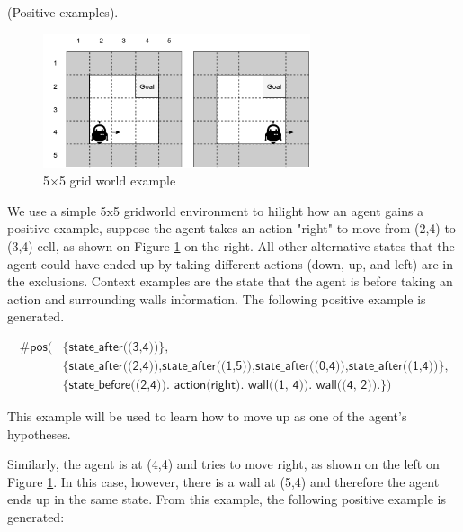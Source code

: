 
\begin{examp} \normalfont (Positive examples).

\begin{figure}[!htb]
\centering
\includegraphics[width=0.7\textwidth]{./figures/pipeline_example1}
\caption{5$\times$5 grid world example}
\label{example_pos_example}
\end{figure}

We use a simple 5x5 gridworld environment to hilight how an agent gains a positive example, suppose the agent takes an action "right" to move from (2,4) to (3,4) cell, as shown on Figure \ref{example_pos_example} on the right.
All other alternative states that the agent could have ended up by taking different actions
(down, up, and left) are in the exclusions.
Context examples are the state that the agent is before taking an action and surrounding walls information. The following positive example is generated.

\begin{equation}
\begin{split}
    \textsf{\#pos(} & \textsf{\{state\_after((3,4))\},}\\
                    & \textsf{\{state\_after((2,4)),state\_after((1,5)),state\_after((0,4)),state\_after((1,4))\},} \\
    & \textsf{\{state\_before((2,4)). action(right). wall((1, 4)). wall((4, 2)).\})}
\end{split}
\end{equation}

This example will be used to learn how to move up as one of the agent's hypotheses.

Similarly, the agent is at (4,4) and tries to move right, as shown on the left on Figure \ref{example_pos_example}. In this case, however, there is a wall at (5,4) and therefore the agent ends up in the same state. From this example, the following positive example is generated:


\end{examp}
